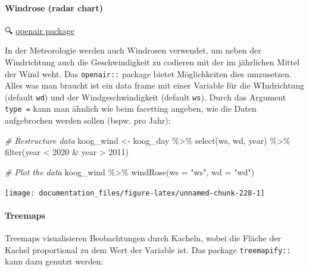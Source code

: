\documentclass[
]{article}
\newenvironment{Shaded}{\begin{snugshade}}{\end{snugshade}}
\newcommand{\AttributeTok}[1]{\textcolor[rgb]{0.77,0.63,0.00}{#1}}
\newcommand{\CommentTok}[1]{\textcolor[rgb]{0.56,0.35,0.01}{\textit{#1}}}
\newcommand{\DecValTok}[1]{\textcolor[rgb]{0.00,0.00,0.81}{#1}}
\newcommand{\FunctionTok}[1]{\textcolor[rgb]{0.00,0.00,0.00}{#1}}
\newcommand{\NormalTok}[1]{#1}
\newcommand{\OtherTok}[1]{\textcolor[rgb]{0.56,0.35,0.01}{#1}}
\newcommand{\SpecialCharTok}[1]{\textcolor[rgb]{0.00,0.00,0.00}{#1}}
\newcommand{\StringTok}[1]{\textcolor[rgb]{0.31,0.60,0.02}{#1}}
\begin{document}
\hypertarget{windrose-radar-chart}{%
\paragraph{Windrose (radar chart)}\label{windrose-radar-chart}}

🔍 \href{https://davidcarslaw.github.io/openair/reference/windRose.html}{openair package}

In der Meteorologie werden auch Windrosen verwendet, um neben der Windrichtung auch die Geschwindigkeit zu codieren mit der im jährlichen Mittel der Wind weht. Das \texttt{openair::} package bietet Möglichkeiten dies umzusetzen. Alles was man braucht ist ein data frame mit einer Variable für die WIndrichtung (default \texttt{wd}) und der Windgeschwindigkeit (default \texttt{ws}). Durch das Argument \texttt{type\ =} kann man ähnlich wie beim facetting angeben, wie die Daten aufgebrochen werden sollen (bspw. pro Jahr):

\begin{Shaded}
\begin{Highlighting}[]
\CommentTok{\# Restructure data}
\NormalTok{koog\_wind }\OtherTok{\textless{}{-}}\NormalTok{ koog\_day }\SpecialCharTok{\%\textgreater{}\%}
  \FunctionTok{select}\NormalTok{(ws, wd, year) }\SpecialCharTok{\%\textgreater{}\%}
  \FunctionTok{filter}\NormalTok{(year }\SpecialCharTok{\textless{}} \DecValTok{2020} \SpecialCharTok{\&}\NormalTok{ year }\SpecialCharTok{\textgreater{}} \DecValTok{2011}\NormalTok{)}

\CommentTok{\# Plot the data}
\NormalTok{koog\_wind }\SpecialCharTok{\%\textgreater{}\%}
  \FunctionTok{windRose}\NormalTok{(}\AttributeTok{ws =} \StringTok{"ws"}\NormalTok{, }\AttributeTok{wd =} \StringTok{"wd"}\NormalTok{)}
\end{Highlighting}
\end{Shaded}

\begin{center}\texttt{[image: documentation\_files/figure-latex/unnamed-chunk-228-1]} \end{center}

\hypertarget{treemaps}{%
\paragraph{Treemaps}\label{treemaps}}

Treemaps visualisieren Beobachtungen durch Kacheln, wobei die Fläche der Kachel proportional zu dem Wert der Variable ist. Das package \texttt{treemapify::} kann dazu genutzt werden:
\end{document}
